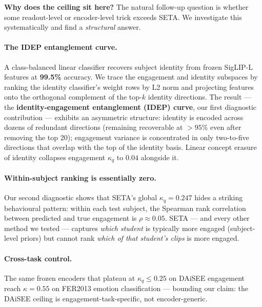 \textbf{Why does the ceiling sit here?} The natural follow-up
question is whether some readout-level or encoder-level trick
exceeds SETA. We investigate this systematically and find a
\emph{structural} answer.

\paragraph{The IDEP entanglement curve.} A class-balanced linear
classifier recovers subject identity from frozen SigLIP-L features
at \textbf{99.5\%} accuracy. We trace the engagement and identity
subspaces by ranking the identity classifier's weight rows by L2
norm and projecting features onto the orthogonal complement of the
top-$k$ identity directions. The result --- the
\textbf{identity-engagement entanglement (IDEP) curve}, our first
diagnostic contribution --- exhibits an asymmetric structure:
identity is encoded across dozens of redundant directions
(remaining recoverable at $> 95\%$ even after removing the top 20);
engagement variance is concentrated in only two-to-five
directions that overlap with the top of the identity basis.
Linear concept erasure~\cite{belrose2023leace} of identity
collapses engagement $\kappa_q$ to $0.04$ alongside it.

\paragraph{Within-subject ranking is essentially zero.} Our second
diagnostic shows that SETA's global $\kappa_q = 0.247$ hides a
striking behavioural pattern: within each test subject, the
Spearman rank correlation between predicted and true engagement
is \textbf{$\rho \approx 0.05$}. SETA --- and every other method we
tested --- captures \emph{which student} is typically more engaged
(subject-level priors) but cannot rank \emph{which of that
student's clips} is more engaged.

\paragraph{Cross-task control.} The same frozen encoders that
plateau at $\kappa_q \le 0.25$ on DAiSEE engagement reach
$\kappa = 0.55$ on FER2013 emotion classification --- bounding our
claim: the DAiSEE ceiling is engagement-task-specific, not
encoder-generic.

